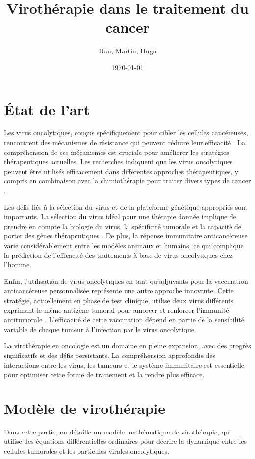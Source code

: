 \documentclass{article}
\title{Virothérapie dans le traitement du cancer}
\author{Dan, Martin, Hugo}
\date{\today}
\begin{document}
\maketitle

\section{État de l'art}

Les virus oncolytiques, conçus spécifiquement pour cibler les cellules cancéreuses, rencontrent des mécanismes de résistance qui peuvent réduire leur efficacité \cite{goradel2022}. La compréhension de ces mécanismes est cruciale pour améliorer les stratégies thérapeutiques actuelles. Les recherches indiquent que les virus oncolytiques peuvent être utilisés efficacement dans différentes approches thérapeutiques, y compris en combinaison avec la chimiothérapie pour traiter divers types de cancer \cite{zeyaullah2012}.

Les défis liés à la sélection du virus et de la plateforme génétique appropriés sont importants. La sélection du virus idéal pour une thérapie donnée implique de prendre en compte la biologie du virus, la spécificité tumorale et la capacité de porter des gènes thérapeutiques \cite{mcfadden2021}. De plus, la réponse immunitaire anticancéreuse varie considérablement entre les modèles animaux et humains, ce qui complique la prédiction de l'efficacité des traitements à base de virus oncolytiques chez l'homme.

Enfin, l'utilisation de virus oncolytiques en tant qu'adjuvants pour la vaccination anticancéreuse personnalisée représente une autre approche innovante. Cette stratégie, actuellement en phase de test clinique, utilise deux virus différents exprimant le même antigène tumoral pour amorcer et renforcer l'immunité antitumorale \cite{roy2021}. L'efficacité de cette vaccination dépend en partie de la sensibilité variable de chaque tumeur à l'infection par le virus oncolytique.

La virothérapie en oncologie est un domaine en pleine expansion, avec des progrès significatifs et des défis persistants. La compréhension approfondie des interactions entre les virus, les tumeurs et le système immunitaire est essentielle pour optimiser cette forme de traitement et la rendre plus efficace.

\section{Modèle de virothérapie}
Dans cette partie, on détaille un modèle mathématique de virothérapie, qui utilise des équations différentielles ordinaires pour décrire la dynamique entre les cellules tumorales et les particules virales oncolytiques.
\end{document}
